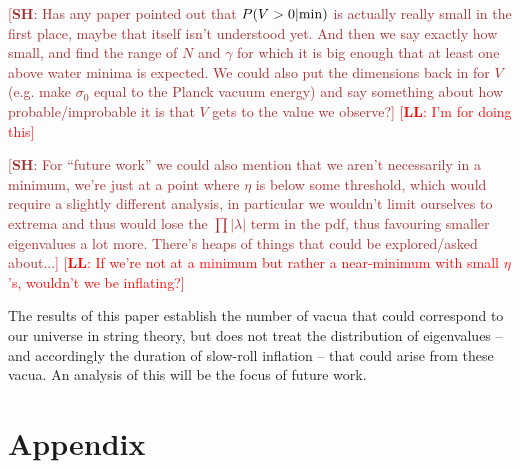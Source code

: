 \documentclass[12pt]{article}
\newcommand{\lfl}[1]{\textcolor{red}{[{\bf LL}: #1]}}
\newcommand{\SH}[1]{\textcolor{brown}{[{\bf SH}: #1]}}
\begin{document}
\SH{Has any paper pointed out that $P(V>0|{\rm min})$ is actually really small in the first place, maybe that itself isn't understood yet. And then we say exactly how small, and find the range of $N$ and $\gamma$ for which it is big enough that at least one above water minima is expected. We could also put the dimensions back in for $V$ (e.g. make $\sigma_0$ equal to the Planck vacuum energy)  and say something about how probable/improbable it is that $V$ gets to the value we observe?} \lfl{I'm for doing this}

\SH{For ``future work'' we could also mention that we aren't necessarily in a minimum, we're just at a point where $\eta$ is below some threshold, which would require a slightly different analysis, in particular we wouldn't limit ourselves to extrema and thus would lose the $\prod |\lambda|$ term in the pdf, thus favouring smaller eigenvalues a lot more. There's heaps of things that could be explored/asked about...} \lfl{If we're not at a minimum but rather a near-minimum with small $\eta$'s, wouldn't we be inflating?}




The results of this paper establish the number of vacua that could correspond to our universe in string theory, but does not treat the distribution of eigenvalues -- and accordingly the duration of slow-roll inflation -- that could arise from these vacua. An analysis of this will be the focus of future work.

\section{Appendix}
%
%
\end{document}
